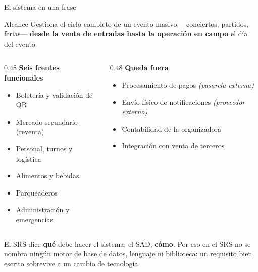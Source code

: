 \documentclass[aspectratio=169,10pt,xcolor={table}]{beamer}
\begin{document}
\begin{frame}{El sistema en una frase}
  \begin{block}{Alcance}
    Gestiona el ciclo completo de un evento masivo ---conciertos, partidos, ferias---
    \textbf{desde la venta de entradas hasta la operación en campo} el día del evento.
  \end{block}

  \vspace{0.4em}
  \begin{columns}[T]
    \begin{column}{0.48\textwidth}
      \textbf{Seis frentes funcionales}
      \begin{itemize}\small
        \item Boletería y validación de QR
        \item Mercado secundario (reventa)
        \item Personal, turnos y logística
        \item Alimentos y bebidas
        \item Parqueaderos
        \item Administración y emergencias
      \end{itemize}
    \end{column}
    \begin{column}{0.48\textwidth}
      \textbf{Queda fuera}
      \begin{itemize}\small
        \item Procesamiento de pagos \textit{(pasarela externa)}
        \item Envío físico de notificaciones \textit{(proveedor externo)}
        \item Contabilidad de la organizadora
        \item Integración con venta de terceros
      \end{itemize}
    \end{column}
  \end{columns}

  \vspace{0.6em}
  \footnotesize
  El SRS dice \textbf{qué} debe hacer el sistema; el SAD, \textbf{cómo}. Por eso en el SRS no se
  nombra ningún motor de base de datos, lenguaje ni biblioteca: un requisito bien escrito
  sobrevive a un cambio de tecnología.
\end{frame}
\end{document}
